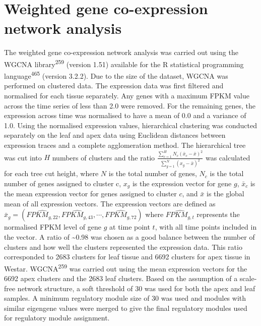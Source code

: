 \documentclass[12pt,]{book}
\begin{document}
\section{Weighted gene co-expression network
analysis}\label{weighted-gene-co-expression-network-analysis}

The weighted gene co-expression network analysis was carried out using
the WGCNA library\textsuperscript{259} (version 1.51) available for the
R statistical programming language\textsuperscript{465} (version 3.2.2).
Due to the size of the dataset, WGCNA was performed on clustered data.
The expression data was first filtered and normalised for each tissue
separately. Any genes with a maximum FPKM value across the time series
of less than 2.0 were removed. For the remaining genes, the expression
across time was normalised to have a mean of 0.0 and a variance of 1.0.
Using the normalised expression values, hierarchical clustering was
conducted separately on the leaf and apex data using Euclidean distances
between expression traces and a complete agglomeration method. The
hierarchical tree was cut into \(H\) numbers of clusters and the ratio
\(\frac{\sum_{c=1}^{H}N_{c}(\bar{x}_{c}-\bar{x})^2}{\sum_{g=1}^{N}(x_{g}-\bar{x})^2}\)
was calculated for each tree cut height, where \(N\) is the total number
of genes, \(N_{c}\) is the total number of genes assigned to cluster c,
\(x_{g}\) is the expression vector for gene \(g\), \(\bar{x}_{c}\) is
the mean expression vector for genes assigned to cluster \(c\), and
\(\bar{x}\) is the global mean of all expression vectors. The expression
vectors are defined as
\(\bar{x}_{g} = (\widehat{\mathit{FPKM}_{g,22}}, \widehat{\mathit{FPKM}_{g,43}}, \cdots, \widehat{\mathit{FPKM}_{g,72}})\)
where \(\widehat{\mathit{FPKM}_{g,t}}\) represents the normalised FPKM
level of gene \(g\) at time point \(t\), with all time points included
in the vector. A ratio of \textasciitilde{}0.98 was chosen as a good
balance between the number of clusters and how well the clusters
represented the expression data. This ratio corresponded to 2683
clusters for leaf tissue and 6692 clusters for apex tissue in Westar.
WGCNA\textsuperscript{259} was carried out using the mean expression
vectors for the 6692 apex clusters and the 2683 leaf clusters. Based on
the assumption of a scale-free network structure, a soft threshold of 30
was used for both the apex and leaf samples. A minimum regulatory module
size of 30 was used and modules with similar eigengene values were
merged to give the final regulatory modules used for regulatory module
assignment.
\end{document}
